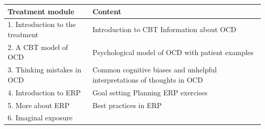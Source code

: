\documentclass[]{book}
\theoremstyle{definition}
\theoremstyle{definition}
\theoremstyle{definition}
\theoremstyle{remark}
\begin{document}
\begin{longtable}[]{@{}ll@{}}
\toprule
\begin{minipage}[b]{0.47\columnwidth}\raggedright
\textbf{Treatment module}\strut
\end{minipage} & \begin{minipage}[b]{0.47\columnwidth}\raggedright
\textbf{Content}\strut
\end{minipage}\tabularnewline
\midrule
\endhead
\begin{minipage}[t]{0.47\columnwidth}\raggedright
1. Introduction to the treatment\strut
\end{minipage} & \begin{minipage}[t]{0.47\columnwidth}\raggedright
Introduction to CBT Information about OCD\strut
\end{minipage}\tabularnewline
\begin{minipage}[t]{0.47\columnwidth}\raggedright
2. A CBT model of OCD\strut
\end{minipage} & \begin{minipage}[t]{0.47\columnwidth}\raggedright
Psychological model of OCD with patient examples\strut
\end{minipage}\tabularnewline
\begin{minipage}[t]{0.47\columnwidth}\raggedright
3. Thinking mistakes in OCD\strut
\end{minipage} & \begin{minipage}[t]{0.47\columnwidth}\raggedright
Common cognitive biases and unhelpful interpretations of thoughts in
OCD\strut
\end{minipage}\tabularnewline
\begin{minipage}[t]{0.47\columnwidth}\raggedright
4. Introduction to ERP\strut
\end{minipage} & \begin{minipage}[t]{0.47\columnwidth}\raggedright
Goal setting Planning ERP exercises\strut
\end{minipage}\tabularnewline
\begin{minipage}[t]{0.47\columnwidth}\raggedright
5. More about ERP\strut
\end{minipage} & \begin{minipage}[t]{0.47\columnwidth}\raggedright
Best practices in ERP\strut
\end{minipage}\tabularnewline
\begin{minipage}[t]{0.47\columnwidth}\raggedright
6. Imaginal exposure\strut
\end{minipage} & \begin{minipage}[t]{0.47\columnwidth}\raggedright

\end{minipage}
\end{longtable}
\end{document}

